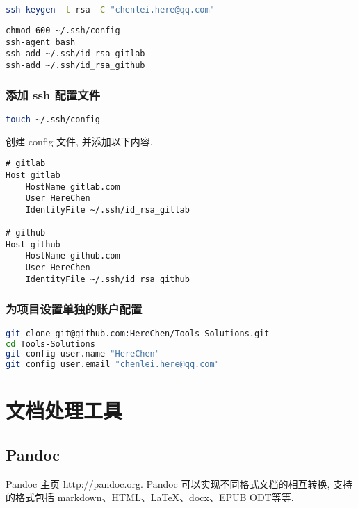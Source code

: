 \begin{lstlisting}[language=bash]
ssh-keygen -t rsa -C "chenlei.here@qq.com"
\end{lstlisting}

\begin{lstlisting}
chmod 600 ~/.ssh/config
ssh-agent bash
ssh-add ~/.ssh/id_rsa_gitlab
ssh-add ~/.ssh/id_rsa_github
\end{lstlisting}

\subsubsection{添加 ssh
配置文件}\label{ux6dfbux52a0-ssh-ux914dux7f6eux6587ux4ef6}

\begin{lstlisting}[language=bash]
touch ~/.ssh/config
\end{lstlisting}

创建 config 文件, 并添加以下内容.

\begin{lstlisting}
# gitlab
Host gitlab
    HostName gitlab.com
    User HereChen
    IdentityFile ~/.ssh/id_rsa_gitlab

# github
Host github
    HostName github.com
    User HereChen
    IdentityFile ~/.ssh/id_rsa_github
\end{lstlisting}

\subsubsection{为项目设置单独的账户配置}\label{ux4e3aux9879ux76eeux8bbeux7f6eux5355ux72ecux7684ux8d26ux6237ux914dux7f6e}

\begin{lstlisting}[language=bash]
git clone git@github.com:HereChen/Tools-Solutions.git
cd Tools-Solutions
git config user.name "HereChen"
git config user.email "chenlei.here@qq.com"
\end{lstlisting}

\section{文档处理工具}\label{ux6587ux6863ux5904ux7406ux5de5ux5177}

\subsection{Pandoc}\label{pandoc}

Pandoc 主页 \url{http://pandoc.org}. Pandoc
可以实现不同格式文档的相互转换, 支持的格式包括
markdown、HTML、LaTeX、docx、EPUB ODT等等.

